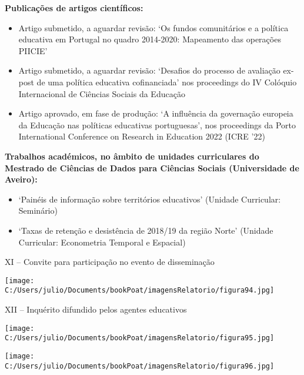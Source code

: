 \documentclass[
]{book}
\begin{document}
\textbf{Publicações de artigos científicos:}

\begin{itemize}
\item
  Artigo submetido, a aguardar revisão: `Os fundos comunitários e a política educativa em Portugal no quadro 2014-2020: Mapeamento das operações PIICIE'
\item
  Artigo submetido, a aguardar revisão: `Desafios do processo de avaliação ex-post de uma política educativa cofinanciada' nos proceedings do IV Colóquio Internacional de Ciências Sociais da Educação
\item
  Artigo aprovado, em fase de produção: `A influência da governação europeia da Educação nas políticas educativas portuguesas', nos proceedings da Porto International Conference on Research in Education 2022 (ICRE '22)
\end{itemize}

\textbf{Trabalhos académicos, no âmbito de unidades curriculares do Mestrado de Ciências de Dados para Ciências Sociais (Universidade de Aveiro):}

\begin{itemize}
\item
  `Painéis de informação sobre territórios educativos' (Unidade Curricular: Seminário)
\item
  `Taxas de retenção e desistência de 2018/19 da região Norte' (Unidade Curricular: Econometria Temporal e Espacial)
\end{itemize}

XI -- Convite para participação no evento de disseminação

\texttt{[image: C:/Users/julio/Documents/bookPoat/imagensRelatorio/figura94.jpg]}

XII -- Inquérito difundido pelos agentes educativos

\texttt{[image: C:/Users/julio/Documents/bookPoat/imagensRelatorio/figura95.jpg]}

\texttt{[image: C:/Users/julio/Documents/bookPoat/imagensRelatorio/figura96.jpg]}

  
\end{document}
